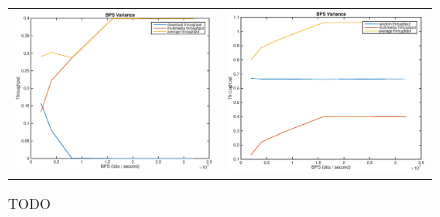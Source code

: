 \begin{figure}
\begin{center}
\begin{tabular}{cc}
\includegraphics[scale=0.35]{../../src/fig-simulation_download_multimedia-bps-1_1_5_25_12000.eps} & \includegraphics[scale=0.35]{../../src/fig-simulation_random_multimedia-bps-1_0_1_0_12000.eps}
\end{tabular}
\caption{TODO}
\label{fig:multimedia}
\end{center}
\end{figure}


